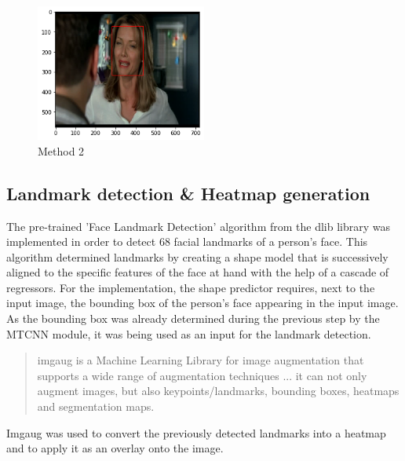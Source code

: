 \begin{center}
\begin{figure}[H]
  \begin{center}
  \includegraphics[angle=0, width=0.5\textwidth]{Figures/method_2.png}
  \caption{Method 2}
  \label{fig:MachineLearningModelMethod_2}
  \end{center}
\end{figure}
\end{center}

\subsection{Landmark detection \& Heatmap generation}
The pre-trained 'Face Landmark Detection' algorithm \citep{Kazemi:2014:ShapePredictor} from the dlib library was implemented in order to detect 68 facial landmarks of a person's face. This algorithm determined landmarks by creating a shape model that is successively aligned to the specific features of the face at hand with the help of a cascade of regressors.
\newline\newline
For the implementation, the shape predictor requires, next to the input image, the bounding box of the person's face appearing in the input image. As the bounding box was already determined during the previous step by the \gls{MTCNN} module, it was being used as an input for the landmark detection. \citep{Datahacker:2020:DlibFacialLandmarks}
\newline\newline

\begin{quote}
    imgaug is a Machine Learning Library for image augmentation that supports a wide range of augmentation techniques ... it can not only augment images, but also keypoints/landmarks, bounding boxes, heatmaps and segmentation maps. \citep[~para. 1]{Jung:2020:Imgaug}
\end{quote}
Imgaug was used to convert the previously detected landmarks into a heatmap and to apply it as an overlay onto the image.

